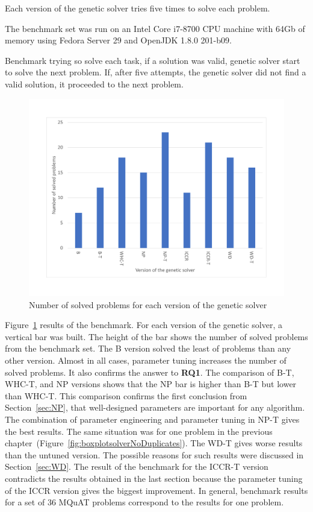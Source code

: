 Each version of the genetic solver tries five times to solve each problem.

The benchmark set was run on an Intel Core i7-8700 CPU machine with 64Gb of memory using Fedora Server 29 and OpenJDK 1.8.0 201-b09.

Benchmark trying so solve each task, if a solution was valid, genetic solver start to solve the next problem. If, after five attempts, the genetic solver did not find a valid solution, it proceeded to the next problem.

\begin{figure}
	\centering
	\includegraphics[width=\textwidth]{images/EvaluationNumberOfSolvedProblems.pdf}
	\caption[Number of problems for each version of the genetic solver]{Number of solved problems for each version of the genetic solver}
	\label{fig:EvaluationNumberOfSolvedProblems}
\end{figure}

Figure~\ref{fig:EvaluationNumberOfSolvedProblems} results of the benchmark. For each version of the genetic solver, a vertical bar was built. The height of the bar shows the number of solved problems from the benchmark set. The B version solved the least of problems than any other version. Almost in all cases, parameter tuning increases the number of solved problems. It also confirms the answer to \textbf{RQ1}. The comparison of B-T, WHC-T, and NP versions shows that the NP bar is higher than B-T but lower than WHC-T. This comparison confirms the first conclusion from Section~\ref{sec:NP}, that well-designed parameters are important for any algorithm. The combination of parameter engineering and parameter tuning in NP-T gives the best results. The same situation was for one problem in the previous chapter~(Figure~\ref{fig:boxplotsolverNoDuplicates}). The WD-T gives worse results than the untuned version. The possible reasons for such results were discussed in Section~\ref{sec:WD}. The result of the benchmark for the ICCR-T version contradicts the results obtained in the last section because the parameter tuning of the ICCR version gives the biggest improvement. In general, benchmark results for a set of 36 MQuAT problems correspond to the results for one problem.

